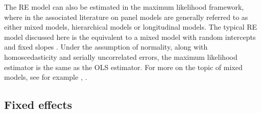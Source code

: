 \documentclass[]{interact}
\theoremstyle{plain}%
\theoremstyle{definition}
\theoremstyle{remark}
\begin{document}
The RE model can also be estimated in the maximum likelihood framework,
where in the associated literature on panel models are generally
referred to as either mixed models, hierarchical models or longitudinal
models. The typical RE model discussed here is the equivalent to a mixed
model with random intercepts and fixed slopes \citep{R-plm_a}. Under the
assumption of normality, along with homoscedasticity and serially
uncorrelated errors, the maximum likelihood estimator is the same as the
OLS estimator. For more on the topic of mixed models, see for example
\citet{R-lme4}, \citet{Bates2010}.

\hypertarget{fe}{%
\subsection{Fixed effects}\label{fe}}
\end{document}
